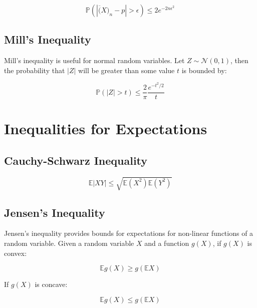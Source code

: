\begin{equation}
\mathbb{P}(|\overline(X)_n - p| > \epsilon) \leq 2e^{-2n\epsilon^2}
\end{equation}

\subsection{Mill's Inequality}
Mill's inequality is useful for normal random variables. Let $Z \sim \mathscr{N}(0,1)$, then the probability that $|Z|$ will be greater than some value $t$ is bounded by: 

\begin{equation}
\mathbb{P}(|Z|>t) \leq \frac{2}{\pi}\frac{e^{-t^2/2}}{t}
\end{equation}


\section{Inequalities for Expectations}

\subsection{Cauchy-Schwarz Inequality}

\begin{equation}
\mathbb{E}|XY|\leq \sqrt{\mathbb{E}(X^2) \mathbb{E}(Y^2)}
\end{equation}



\subsection{Jensen's Inequality}

Jensen's inequality provides bounds for expectations for non-linear functions of a random variable. Given a random variable $X$ and a function $g(X)$, if $g(X)$ is convex:

\begin{equation}
\mathbb{E}g(X) \geq g(\mathbb{E}X)
\end{equation}

If $g(X)$ is concave:

\begin{equation}
\mathbb{E}g(X) \leq g(\mathbb{E}X)
\end{equation}


